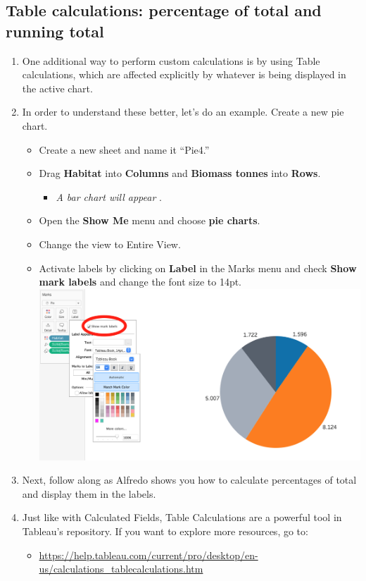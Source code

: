 \documentclass[
]{book}
\providecommand{\tightlist}{%
  \setlength{\itemsep}{0pt}\setlength{\parskip}{0pt}}
\begin{document}
\hypertarget{table-calculations-percentage-of-total-and-running-total}{%
\subsection{Table calculations: percentage of total and running total}\label{table-calculations-percentage-of-total-and-running-total}}

\begin{enumerate}
\def\labelenumi{\arabic{enumi}.}
\item
  One additional way to perform custom calculations is by using Table calculations, which are affected explicitly by whatever is being displayed in the active chart.
\item
  In order to understand these better, let's do an example. Create a new pie chart.

  \begin{itemize}
  \tightlist
  \item
    Create a new sheet and name it ``Pie4.''
  \item
    Drag \textbf{Habitat} into \textbf{Columns} and \textbf{Biomass tonnes} into \textbf{Rows}.

    \begin{itemize}
    \tightlist
    \item
      \emph{A bar chart will appear }.
    \end{itemize}
  \item
    Open the \textbf{Show Me} menu and choose \textbf{pie charts}.
  \item
    Change the view to Entire View.
  \item
    Activate labels by clicking on \textbf{Label} in the Marks menu and check \textbf{Show mark labels} and change the font size to 14pt.
    \includegraphics{images/m3s4_pie-show-labels.png}
  \end{itemize}
\item
  Next, follow along as Alfredo shows you how to calculate percentages of total and display them in the labels.
\item
  Just like with Calculated Fields, Table Calculations are a powerful tool in Tableau's repository. If you want to explore more resources, go to:

  \begin{itemize}
  \tightlist
  \item
    \url{https://help.tableau.com/current/pro/desktop/en-us/calculations_tablecalculations.htm}
  \end{itemize}
\end{enumerate}
\end{document}
